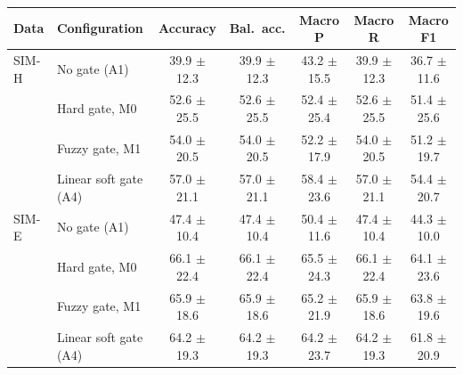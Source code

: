 \begin{tabular}{@{}llccccc@{}}
\toprule
Data & Configuration & Accuracy & Bal.\ acc. & Macro P & Macro R & Macro F1\\
\midrule
SIM-H & No gate (A1) & 39.9 $\pm$ 12.3 & 39.9 $\pm$ 12.3 & 43.2 $\pm$ 15.5 & 39.9 $\pm$ 12.3 & 36.7 $\pm$ 11.6\\
 & Hard gate, M0 & 52.6 $\pm$ 25.5 & 52.6 $\pm$ 25.5 & 52.4 $\pm$ 25.4 & 52.6 $\pm$ 25.5 & 51.4 $\pm$ 25.6\\
 & Fuzzy gate, M1 & 54.0 $\pm$ 20.5 & 54.0 $\pm$ 20.5 & 52.2 $\pm$ 17.9 & 54.0 $\pm$ 20.5 & 51.2 $\pm$ 19.7\\
 & Linear soft gate (A4) & 57.0 $\pm$ 21.1 & 57.0 $\pm$ 21.1 & 58.4 $\pm$ 23.6 & 57.0 $\pm$ 21.1 & 54.4 $\pm$ 20.7\\
\midrule
SIM-E & No gate (A1) & 47.4 $\pm$ 10.4 & 47.4 $\pm$ 10.4 & 50.4 $\pm$ 11.6 & 47.4 $\pm$ 10.4 & 44.3 $\pm$ 10.0\\
 & Hard gate, M0 & 66.1 $\pm$ 22.4 & 66.1 $\pm$ 22.4 & 65.5 $\pm$ 24.3 & 66.1 $\pm$ 22.4 & 64.1 $\pm$ 23.6\\
 & Fuzzy gate, M1 & 65.9 $\pm$ 18.6 & 65.9 $\pm$ 18.6 & 65.2 $\pm$ 21.9 & 65.9 $\pm$ 18.6 & 63.8 $\pm$ 19.6\\
 & Linear soft gate (A4) & 64.2 $\pm$ 19.3 & 64.2 $\pm$ 19.3 & 64.2 $\pm$ 23.7 & 64.2 $\pm$ 19.3 & 61.8 $\pm$ 20.9\\
\bottomrule
\end{tabular}
